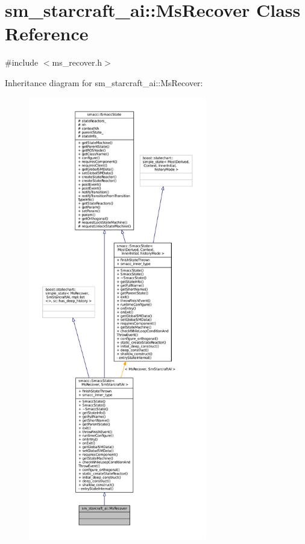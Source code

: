 \hypertarget{classsm__starcraft__ai_1_1MsRecover}{}\section{sm\+\_\+starcraft\+\_\+ai\+:\+:Ms\+Recover Class Reference}
\label{classsm__starcraft__ai_1_1MsRecover}


{\ttfamily \#include $<$ms\+\_\+recover.\+h$>$}



Inheritance diagram for sm\+\_\+starcraft\+\_\+ai\+:\+:Ms\+Recover\+:
\nopagebreak
\begin{figure}[H]
\begin{center}
\leavevmode
\includegraphics[height=550pt]{classsm__starcraft__ai_1_1MsRecover__inherit__graph}
\end{center}
\end{figure}


